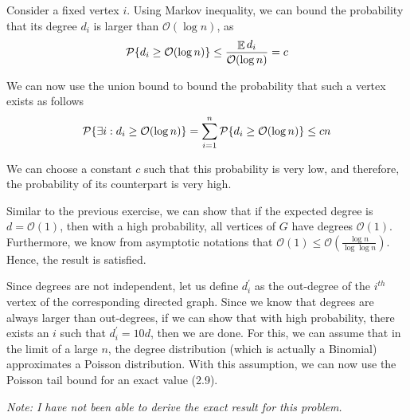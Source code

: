 \documentclass[11pt]{article}
\newenvironment{exercise}[2][Exercise]{\begin{trivlist}
\item[\hskip \labelsep {\bfseries #1}\hskip \labelsep {\bfseries #2.}]}{\end{trivlist}}
\newenvironment{solution}[1][Solution]{\begin{trivlist}
\item[\hskip \labelsep {\bfseries #1}\hskip \labelsep]}{\end{trivlist}}
\DeclareMathOperator*{\E}{\mathbb{E}}
\begin{document}
\begin{exercise}{2.4.2}
\end{exercise}

\begin{solution}
Consider a fixed vertex $i$. Using Markov inequality, we can bound the probability that its degree $d_i$ is larger than $\mathcal{O}(\log n)$, as
\begin{equation*}
\mathcal{P}\{ d_i \geq \mathcal{O}(\log n) \} \leq \frac{\E d_i}{\mathcal{O}(\log n)} = c \\
\end{equation*}

We can now use the union bound to bound the probability that such a vertex exists as follows
\begin{equation*}
\mathcal{P}\{\exists i : d_i \geq \mathcal{O}(\log n) \} = \sum_{i=1}^n\mathcal{P}\{d_i \geq \mathcal{O}(\log n) \}  \leq cn  \\
\end{equation*}

We can choose a constant $c$ such that this probability is very low, and therefore, the probability of its counterpart is very high.
\end{solution}

\begin{exercise}{2.4.3}
\end{exercise}

\begin{solution}
Similar to the previous exercise, we can show that if the expected degree is $d = \mathcal{O}(1)$, then with a high probability, all vertices of $G$ have degrees $\mathcal{O}(1)$. Furthermore, we know from asymptotic notations that $\mathcal{O}(1) \leq \mathcal{O}\left(\frac{\log n}{\log \log n}\right)$. Hence, the result is satisfied.
\end{solution}

\begin{exercise}{2.4.4}
\end{exercise}

\begin{solution}
Since degrees are not independent, let us define $d_i^{\prime}$ as the out-degree of the $i^{th}$ vertex of the corresponding directed graph. Since we know that degrees are always larger than out-degrees, if we can show that with high probability, there exists an $i$ such that $d_i^{\prime} = 10d$, then we are done. For this, we can assume that in the limit of a large $n$, the degree distribution (which is actually a Binomial) approximates a Poisson distribution. With this assumption, we can now use the Poisson tail bound for an exact value (2.9).

\textit{Note: I have not been able to derive the exact result for this problem.}
\end{solution}
\end{document}
